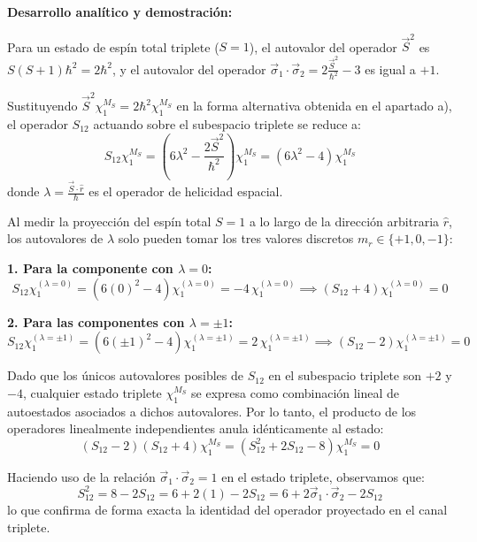\begin{problema}
\textbf{Desarrollo analítico y demostración:}

Para un estado de espín total triplete ($S = 1$), el autovalor del operador $\vec{S}^2$ es $S(S+1)\hbar^2 = 2\hbar^2$, y el autovalor del operador $\vec{\sigma}_1 \cdot \vec{\sigma}_2 = 2\frac{\vec{S}^2}{\hbar^2} - 3$ es igual a $+1$.

Sustituyendo $\vec{S}^2 \chi_1^{M_S} = 2\hbar^2 \chi_1^{M_S}$ en la forma alternativa obtenida en el apartado a), el operador $S_{12}$ actuando sobre el subespacio triplete se reduce a:
\begin{equation}
S_{12} \chi_1^{M_S} = \left( 6\lambda^2 - \frac{2\vec{S}^2}{\hbar^2} \right) \chi_1^{M_S} = \left( 6\lambda^2 - 4 \right) \chi_1^{M_S}
\end{equation}
donde $\lambda = \frac{\vec{S} \cdot \hat{r}}{\hbar}$ es el operador de helicidad espacial.

Al medir la proyección del espín total $S = 1$ a lo largo de la dirección arbitraria $\hat{r}$, los autovalores de $\lambda$ solo pueden tomar los tres valores discretos $m_r \in \{+1, 0, -1\}$:

\textbf{1. Para la componente con $\lambda = 0$:}
\begin{equation}
S_{12} \chi_1^{(\lambda=0)} = (6(0)^2 - 4) \chi_1^{(\lambda=0)} = -4 \, \chi_1^{(\lambda=0)} \implies (S_{12} + 4) \chi_1^{(\lambda=0)} = 0
\end{equation}

\textbf{2. Para las componentes con $\lambda = \pm 1$:}
\begin{equation}
S_{12} \chi_1^{(\lambda=\pm 1)} = (6(\pm 1)^2 - 4) \chi_1^{(\lambda=\pm 1)} = 2 \, \chi_1^{(\lambda=\pm 1)} \implies (S_{12} - 2) \chi_1^{(\lambda=\pm 1)} = 0
\end{equation}

Dado que los únicos autovalores posibles de $S_{12}$ en el subespacio triplete son $+2$ y $-4$, cualquier estado triplete $\chi_1^{M_S}$ se expresa como combinación lineal de autoestados asociados a dichos autovalores. Por lo tanto, el producto de los operadores linealmente independientes anula idénticamente al estado:
\begin{equation}
(S_{12} - 2)(S_{12} + 4) \chi_1^{M_S} = \left( S_{12}^2 + 2S_{12} - 8 \right) \chi_1^{M_S} = 0
\end{equation}

Haciendo uso de la relación $\vec{\sigma}_1 \cdot \vec{\sigma}_2 = 1$ en el estado triplete, observamos que:
\begin{equation}
S_{12}^2 = 8 - 2S_{12} = 6 + 2(1) - 2S_{12} = 6 + 2\vec{\sigma}_1 \cdot \vec{\sigma}_2 - 2S_{12}
\end{equation}
lo que confirma de forma exacta la identidad del operador proyectado en el canal triplete.


\end{problema}
